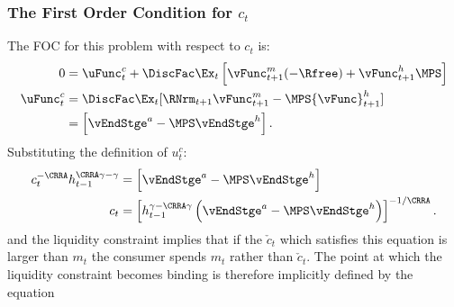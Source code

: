 \documentclass[titlepage, headings=optiontotocandhead]{\econtex}
\begin{document}
{  \subsubsection{The First Order Condition for ${c}_{t}$}
  The FOC for this problem with respect to ${c}_{t}$ is:
  \begin{equation}\begin{gathered}\begin{aligned}
        0  & = \uFunc^{c}_{t} + \DiscFac \Ex_{t} \left[{\vFunc}^{m}_{t+1}(-\Rfree)+{\vFunc}^{h}_{t+1} \MPS\right]  \\
        \uFunc^{c}_{t}  & = \DiscFac \Ex_{t} [\RNrm_{t+1} {\vFunc}_{t+1}^{m}-\MPS {\vFunc}_{t+1}^{h}] \label{eq:ctfoc}
        \\            & = \left[\vEndStge^{{a}}-\MPS \vEndStge^{h} \right].
      \end{aligned}\end{gathered}\end{equation}
  Substituting the definition of $u_{t}^{c}$:
  \begin{equation}\begin{gathered}\begin{aligned}
        {c}_{t}^{-\CRRA}h_{t-1}^{\CRRA\gamma-\gamma}  & = \left[\vEndStge^{{a}}-\MPS \vEndStge^{h} \right]
        \\  {c}_{t}                                     & = \left[h_{t-1}^{\gamma-\CRRA\gamma} \left(\vEndStge^{{a}}-\MPS \vEndStge^{h} \right) \right]^{-1/\CRRA} \label{eq:habitsfoc}.
      \end{aligned}\end{gathered}\end{equation}
  and the liquidity constraint implies that if the $\check{c}_{t}$ which
  satisfies this equation is larger than ${m}_{t}$ the consumer spends
  ${m}_{t}$ rather than $\check{c}_{t}$.  The point at which the liquidity
  constraint becomes binding is therefore implicitly defined by the equation
}
\end{document}
